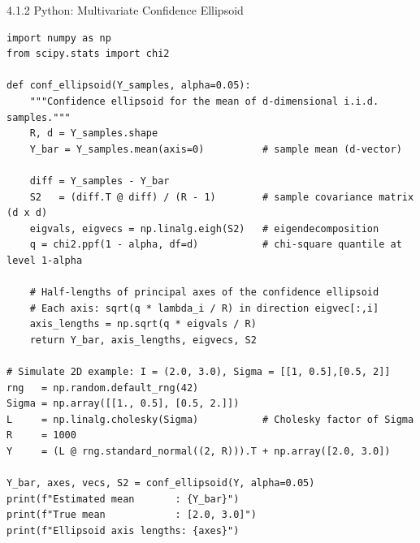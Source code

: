\documentclass[aspectratio=169,10pt]{beamer}
\begin{document}
\begin{frame}[fragile]{4.1.2 Python: Multivariate Confidence Ellipsoid}
\begin{lstlisting}[style=python]
import numpy as np
from scipy.stats import chi2

def conf_ellipsoid(Y_samples, alpha=0.05):
    """Confidence ellipsoid for the mean of d-dimensional i.i.d. samples."""
    R, d = Y_samples.shape
    Y_bar = Y_samples.mean(axis=0)          # sample mean (d-vector)

    diff = Y_samples - Y_bar
    S2   = (diff.T @ diff) / (R - 1)        # sample covariance matrix (d x d)
    eigvals, eigvecs = np.linalg.eigh(S2)   # eigendecomposition
    q = chi2.ppf(1 - alpha, df=d)           # chi-square quantile at level 1-alpha

    # Half-lengths of principal axes of the confidence ellipsoid
    # Each axis: sqrt(q * lambda_i / R) in direction eigvec[:,i]
    axis_lengths = np.sqrt(q * eigvals / R)
    return Y_bar, axis_lengths, eigvecs, S2

# Simulate 2D example: I = (2.0, 3.0), Sigma = [[1, 0.5],[0.5, 2]]
rng   = np.random.default_rng(42)
Sigma = np.array([[1., 0.5], [0.5, 2.]])
L     = np.linalg.cholesky(Sigma)           # Cholesky factor of Sigma
R     = 1000
Y     = (L @ rng.standard_normal((2, R))).T + np.array([2.0, 3.0])

Y_bar, axes, vecs, S2 = conf_ellipsoid(Y, alpha=0.05)
print(f"Estimated mean       : {Y_bar}")
print(f"True mean            : [2.0, 3.0]")
print(f"Ellipsoid axis lengths: {axes}")
\end{lstlisting}
\end{frame}

\end{document}
